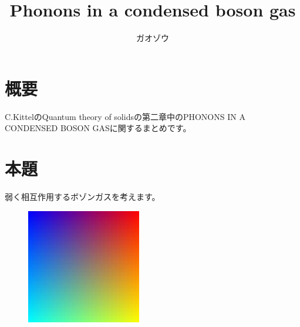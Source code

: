 \documentclass[uplatex,dvipdfmx]{jsarticle}
\title{Phonons in a condensed boson gas}
\author{ガオゾウ}
\begin{document}
\maketitle
\section{概要}
C.KittelのQuantum theory of solidsの第二章中のPHONONS IN A CONDENSED BOSON GASに関するまとめです。

\section{本題}
弱く相互作用するボゾンガスを考えます。
\begin{figure}[htbp]
	\includegraphics[width=5cm]{sample.jpg}
\end{figure}
\end{document}
